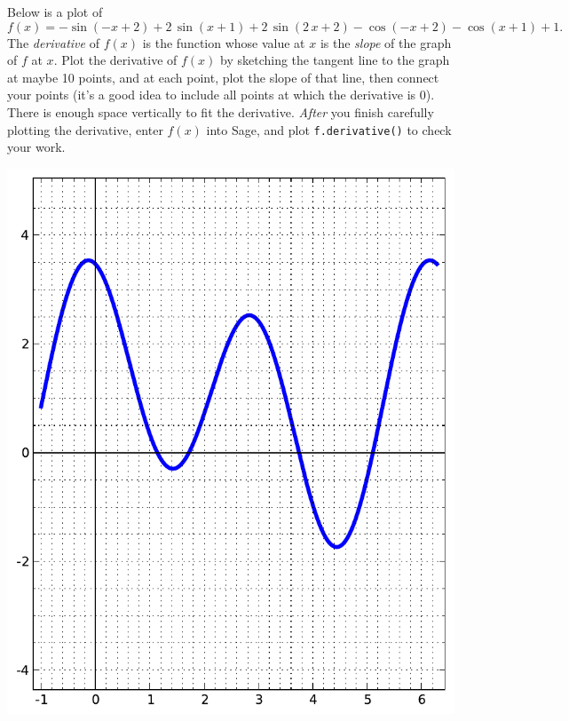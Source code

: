 Below is a plot of $$f(x)=-\sin\left(-x + 2\right) + 2 \, \sin\left(x + 1\right) + 2 \, \sin\left(2 \, x + 2\right) - \cos\left(-x + 2\right) - \cos\left(x + 1\right) + 1.$$  The {\em \color{red}derivative} of $f(x)$ is the function whose value at $x$ is the {\em slope} of the graph of $f$ at $x$.  Plot the derivative of $f(x)$ by sketching the tangent line to the graph at maybe 10 points, and at each point, plot the slope of that line, then connect your points (it's a good idea to include all points at which the derivative is 0).  There is enough space vertically to fit the derivative.  {\em After} you finish carefully plotting the derivative, enter $f(x)$ into Sage, and plot {\color{blue}\verb|f.derivative()|} to check your work.
\begin{center}\includegraphics{functions/8.pdf}\end{center}\newpage


